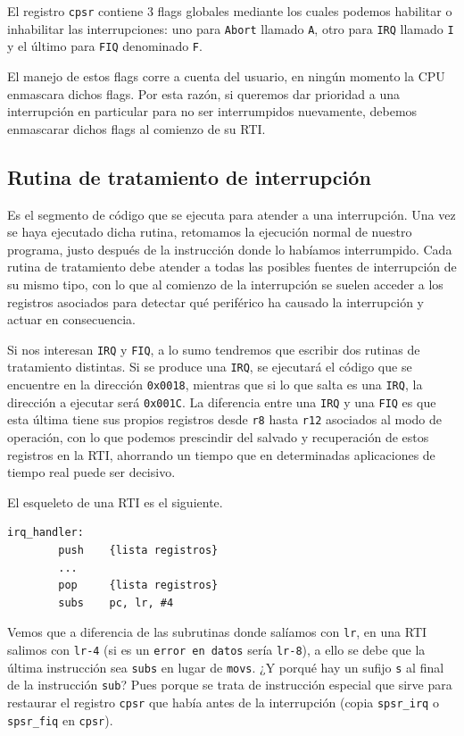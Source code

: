 El registro {\tt cpsr} contiene 3 flags globales mediante los cuales podemos habilitar o
inhabilitar las interrupciones: uno para {\tt Abort} llamado {\tt A}, otro para
{\tt IRQ} llamado {\tt I} y el último para {\tt FIQ} denominado {\tt F}.

El manejo de estos flags corre a cuenta del usuario, en ningún momento la CPU enmascara
dichos flags. Por esta razón, si queremos dar prioridad a una interrupción en particular
para no ser interrumpidos nuevamente, debemos enmascarar dichos flags al comienzo de su RTI.

\subsection{Rutina de tratamiento de interrupción}

Es el segmento de código que se ejecuta para atender a una interrupción. Una vez se haya
ejecutado dicha rutina, retomamos la ejecución normal de nuestro programa, justo después de la instrucción
donde lo habíamos interrumpido. Cada rutina de tratamiento debe atender a todas las posibles
fuentes de interrupción de su mismo tipo, con lo que al comienzo de la interrupción se suelen
acceder a los registros asociados para detectar qué periférico ha causado la interrupción y
actuar en consecuencia.

Si nos interesan {\tt IRQ} y {\tt FIQ}, a lo sumo tendremos que escribir dos
rutinas de tratamiento distintas. Si se produce una {\tt IRQ}, se ejecutará el código
que se encuentre en la dirección {\tt 0x0018}, mientras que si lo que salta es una {\tt IRQ},
la dirección a ejecutar será {\tt 0x001C}. La diferencia entre una {\tt IRQ} y una
{\tt FIQ} es que esta última tiene sus propios registros desde {\tt r8} hasta {\tt r12}
asociados al modo de operación, con lo que podemos prescindir del salvado y recuperación
de estos registros en la RTI, ahorrando un tiempo que en determinadas aplicaciones de
tiempo real puede ser decisivo.

El esqueleto de una RTI es el siguiente.

\begin{lstlisting}
irq_handler:
        push    {lista registros}
        ...
        pop     {lista registros}
        subs    pc, lr, #4
\end{lstlisting}

Vemos que a diferencia de las subrutinas donde salíamos con {\tt lr}, en una RTI salimos
con {\tt lr-4} (si es un {\tt error en datos} sería {\tt lr-8}), a ello se debe que la última
instrucción sea {\tt subs} en lugar de {\tt movs}.
¿Y porqué hay un sufijo {\tt s} al final
de la instrucción {\tt sub}? Pues porque se trata de instrucción especial que sirve para
restaurar el registro {\tt cpsr} que había antes de la interrupción (copia {\tt spsr\_irq} o
{\tt spsr\_fiq} en {\tt cpsr}).

